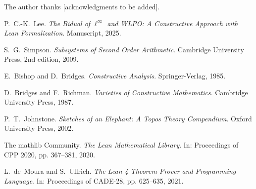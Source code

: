 \documentclass[11pt]{article}
\begin{document}
The author thanks [acknowledgments to be added].

\begin{thebibliography}{10}

P.~C.-K.~Lee. 
\emph{The Bidual of $\ell^\infty$ and WLPO: A Constructive Approach with Lean Formalization}. 
Manuscript, 2025.

S.~G.~Simpson.
\emph{Subsystems of Second Order Arithmetic}.
Cambridge University Press, 2nd edition, 2009.

E.~Bishop and D.~Bridges.
\emph{Constructive Analysis}.
Springer-Verlag, 1985.

D.~Bridges and F.~Richman.
\emph{Varieties of Constructive Mathematics}.
Cambridge University Press, 1987.

P.~T.~Johnstone.
\emph{Sketches of an Elephant: A Topos Theory Compendium}.
Oxford University Press, 2002.

The mathlib Community.
\emph{The Lean Mathematical Library}.
In: Proceedings of CPP 2020, pp. 367--381, 2020.

L.~de~Moura and S.~Ullrich.
\emph{The Lean 4 Theorem Prover and Programming Language}.
In: Proceedings of CADE-28, pp. 625--635, 2021.

\end{thebibliography}
\end{document}
